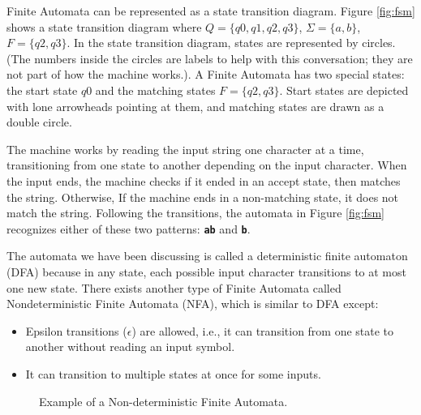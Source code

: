 Finite Automata can be represented as a state transition diagram. Figure \ref{fig:fsm} shows a state transition diagram where $Q = \{q0, q1, q2, q3\}$, $\Sigma = \{a, b\}$, $F = \{q2, q3\}$. In the state transition diagram, states are represented by circles. (The numbers inside the circles are labels to help with this conversation; they are not part of how the machine works.). A Finite Automata has two special states: the start state $q0$ and the matching states $F = \{q2, q3\}$. Start states are depicted with lone arrowheads pointing at them, and matching states are drawn as a double circle.

The machine works by reading the input string one character at a time, transitioning from one state to another depending on the input character. When the input ends, the machine checks if it ended in an accept state, then matches the string. Otherwise, If the machine ends in a non-matching state, it does not match the string. Following the transitions, the automata in Figure \ref{fig:fsm} recognizes either of these two patterns: \texttt{\textbf{ab}} and \texttt{\textbf{b}}.

The automata we have been discussing is called a deterministic finite automaton (DFA) because in any state, each possible input character transitions to at most one new state. There exists another type of Finite Automata called Nondeterministic Finite Automata (NFA), which is similar to DFA except:

\begin{itemize}
    \item Epsilon transitions ($\epsilon$) are allowed, i.e., it can transition from one state to another without reading an input symbol.
    \item It can transition to multiple states at once for some inputs.
\end{itemize}

\begin{figure}[H]
\centering
{}
\caption{Example of a Non-deterministic Finite Automata.}
\label{fig:nfafsm}
\end{figure}

